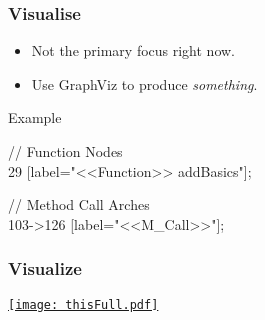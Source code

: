\documentclass[10pt]{beamer}
\begin{document}
\begin{frame}[t]
\frametitle{Visualise}

\begin{itemize}
\item Not the primary focus right now.
\item Use GraphViz to produce \emph{something}.
\end{itemize}

\begin{exampleblock}{Example}
\begin{scriptsize}
// Function Nodes\\
29 [label="<<Function>> addBasics"];

// Method Call Arches\\
103->126 [label="<<M\_Call>>"];\\
\end{scriptsize}
\end{exampleblock}
\end{frame}

\begin{frame}[t]
\frametitle{Visualize}

\href{run:thisFull.dot}{\texttt{[image: thisFull.pdf]}}
\end{frame}







%    
%    

%     

\end{document}
